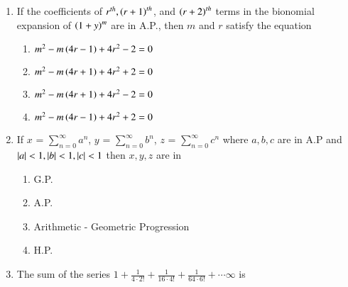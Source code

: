 \documentclass[journal,12pt,twocolumn]{IEEEtran}
\theoremstyle{remark}
\begin{document}
\begin{enumerate}[label={\arabic*.}]
\begin{enumerate}
\end{enumerate}

\item {If the coefficients of $r^{th}, \left(r+1\right)^{th}$, and $\left(r+2\right)^{th}$ terms in the bionomial expansion of $\left(1+y\right)^m$ are in A.P., then $m$ and $r$ satisfy the equation}

{\hfill{}} 
\begin{enumerate}
\item  {$m^2-m\left(4r-1\right)+4r^2-2=0$}
\item  {$m^2-m\left(4r+1\right)+4r^2+2=0$}
\item  {$m^2-m\left(4r+1\right)+4r^2-2=0$}
\item  {$m^2-m\left(4r-1\right)+4r^2+2=0$}
\end{enumerate}

\item {If $x$ = $\sum\limits_{n=0}^{\infty}a^n$, $y$ = $\sum\limits_{n=0}^{\infty}b^n$, $z$ = $\sum\limits_{n=0}^{\infty}c^n$ where $a,b,c$ are in A.P and $\left\vert a\right\vert<1,\left\vert b\right\vert<1,\left\vert c\right\vert<1$ then $x,y,z$ are in}
{\hfill{}} 
\begin{enumerate}
\item  {G.P.}
\item  {A.P.}
\item  {Arithmetic - Geometric Progression}
\item  {H.P.}
\end{enumerate}

\item {The sum of the series $1+\frac{1}{4\cdot2!}+\frac{1}{16\cdot4!}+\frac{1}{64\cdot6!}+\cdots  \infty$ is}
{\hfill{}} 
\begin{enumerate}
\end{enumerate}


\end{enumerate}
\end{document}
